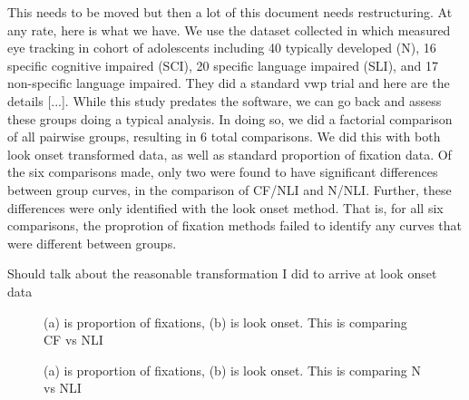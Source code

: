 This needs to be moved but then a lot of this document needs restructuring. At any rate, here is what we have. We use the dataset collected in \cite{mcmurray2010individual} which measured eye tracking in cohort of adolescents including 40 typically developed (N), 16 specific cognitive impaired (SCI), 20 specific language impaired (SLI), and 17 non-specific language impaired. They did a standard vwp trial and here are the details [...]. While this study predates the  software,  we can go back and assess these groups doing a typical analysis.  In doing so, we did a factorial comparison of all pairwise groups, resulting in 6 total comparisons. We did this with both look onset transformed data, as well as standard proportion of fixation data. Of the six comparisons made, only two were found to have significant differences between group curves, in the comparison of CF/NLI and N/NLI. Further, these differences were only identified with the look onset method. That is, for all six comparisons, the proprotion of fixation methods failed to identify any curves that were different between groups.

Should talk about the reasonable transformation I did to arrive at look onset data

\begin{figure}[H]
    \centering
    \caption{(a) is proportion of fixations, (b) is look onset. This is comparing CF vs NLI}
\label{fig:irldata1}
\end{figure}

\begin{figure}[H]
    \centering
    \caption{(a) is proportion of fixations, (b) is look onset. This is comparing N vs NLI}
\label{fig:irldata2}
\end{figure}




